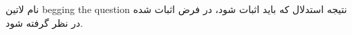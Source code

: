 \documentclass{article}
\begin{document}
	نام لاتین  begging the question
	نتیجه استدلال که باید اثبات شود،‌ در فرض اثبات شده در نظر گرفته شود.\\
	
	
\end{document}
